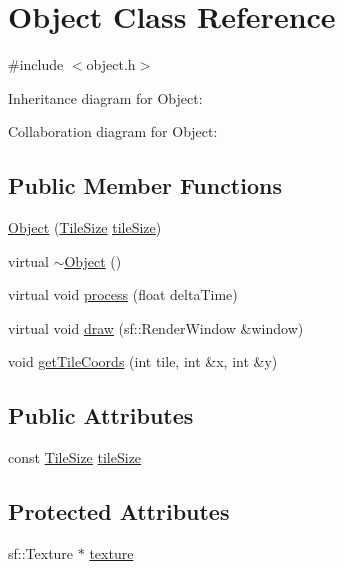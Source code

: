 \hypertarget{classObject}{}\section{Object Class Reference}
\label{classObject}


{\ttfamily \#include $<$object.\+h$>$}



Inheritance diagram for Object\+:


Collaboration diagram for Object\+:
\subsection*{Public Member Functions}
\begin{DoxyCompactItemize}
\item 
\hyperlink{classObject_a0c2b99c7e193a7f310c4df5467040999}{Object} (\hyperlink{structTileSize}{Tile\+Size} \hyperlink{classObject_a40a932c0593ca2687eebc518b2c84c71}{tile\+Size})
\item 
virtual \hyperlink{classObject_ae8f5483f459e46687bd01e6f9977afd3}{$\sim$\+Object} ()
\item 
virtual void \hyperlink{classObject_a5d7bc884ceacd943750903bf2621a6c8}{process} (float delta\+Time)
\item 
virtual void \hyperlink{classObject_a944ca63a566c02245cfa0b6960842f7f}{draw} (sf\+::\+Render\+Window \&window)
\item 
void \hyperlink{classObject_ace7b815442aff0e5baeb71fe5bb7c50f}{get\+Tile\+Coords} (int tile, int \&x, int \&y)
\end{DoxyCompactItemize}
\subsection*{Public Attributes}
\begin{DoxyCompactItemize}
\item 
const \hyperlink{structTileSize}{Tile\+Size} \hyperlink{classObject_a40a932c0593ca2687eebc518b2c84c71}{tile\+Size}
\end{DoxyCompactItemize}
\subsection*{Protected Attributes}
\begin{DoxyCompactItemize}
\item 
sf\+::\+Texture $\ast$ \hyperlink{classObject_a5279eaf90d320e3437f21298a18688fb}{texture}
\end{DoxyCompactItemize}
